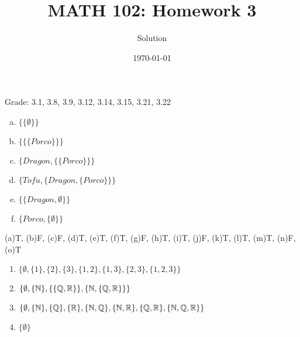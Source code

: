 \documentclass[12pt]{amsart}
\title{ MATH 102: Homework 3}
\author{Solution}
\date{\today}
\begin{document}
\maketitle

Grade: 3.1, 3.8, 3.9, 3.12, 3.14, 3.15, 3.21, 3.22

\begin{problem}[Exercise 3.1]
\begin{enumerate}[a.]
	\item $\{ \{ \emptyset \} \}$
	\item $ \{ \{ \{ Porco \}  \}  \}$
	\item $ \{ Dragon, \{ \{ Porco \}\}\}$
	\item $ \{ Tofu, \{Dragon, \{ Porco \}\}\}$
	\item $ \{  \{ Dragon,\emptyset\}\}$
	\item $ \{ Porco,  \{ \emptyset\}\}$
\end{enumerate}
\end{problem}

\begin{problem}[Exercise 3.8]
(a)T, (b)F, (c)F, (d)T, (e)T, (f)T, (g)F, (h)T, (i)T, (j)F,
(k)T, (l)T, (m)T, (n)F, (o)T
\end{problem}

\begin{problem}[Exercise 3.9]
\begin{enumerate}
	\item $\{ \emptyset, \{1\}, \{2\}, \{3\}, \{1,2\}, \{1,3\}, \{2,3\}, \{1,2,3\}\}$
	\item $ \{ \emptyset, \{ \mathbb{N} \}, \{\{\mathbb{Q}, \mathbb{R} \}\}, \{ \mathbb{N}, \{\mathbb{Q}, \mathbb{R} \}\} \}$
	\item $ \{\emptyset, \{ \mathbb{N} \}, \{\mathbb{Q}\}, \{ \mathbb{R} \}, \{\mathbb{N}, \mathbb{Q}\}, \{ \mathbb{N}, \mathbb{R}\}, \{\mathbb{Q}, \mathbb{R}\}, \{\mathbb{N}, \mathbb{Q}, \mathbb{R} \} \}$
	\item $\{ \emptyset \}$
\end{enumerate}
\end{problem}
\end{document}
